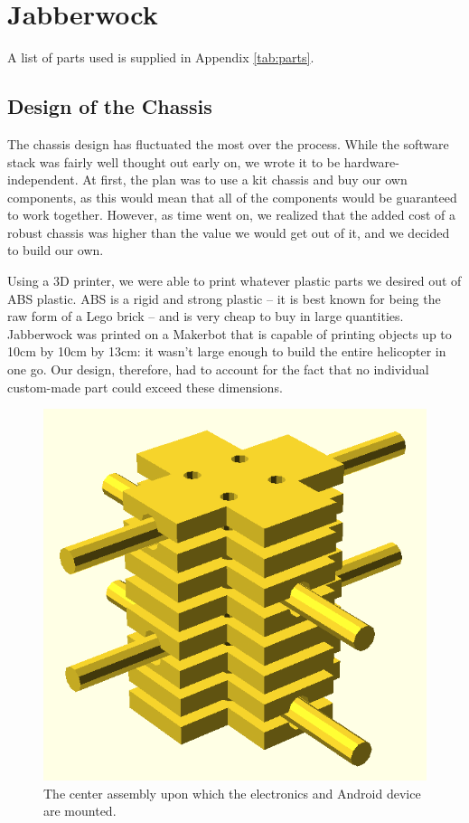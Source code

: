 \section{Jabberwock}
A list of parts used is supplied in Appendix \ref{tab:parts}.

\subsection{Design of the Chassis}
The chassis design has fluctuated the most over the process. While the
software stack was fairly well thought out early on, we wrote it to be
hardware-independent. At first, the plan was to use a kit chassis and
buy our own components, as this would mean that all of the components
would be guaranteed to work together. However, as time went on, we
realized that the added cost of a robust chassis was higher than the
value we would get out of it, and we decided to build our own.

Using a 3D printer, we were able to print whatever plastic parts we
desired out of ABS plastic. ABS is a rigid and strong plastic -- it is
best known for being the raw form of a Lego brick -- and is very cheap
to buy in large quantities. Jabberwock was printed on a Makerbot that
is capable of printing objects up to 10cm by 10cm by 13cm: it
wasn't large enough to build the entire helicopter in one go. Our
design, therefore, had to account for the fact that no individual
custom-made part could exceed these dimensions.

\begin{figure}[htb]
  \centering
  \includegraphics[scale=0.4]{figures/brock_assembly}
  \caption{The center assembly upon which the electronics and Android
    device are mounted.}
  \label{fig:brock}
\end{figure}

